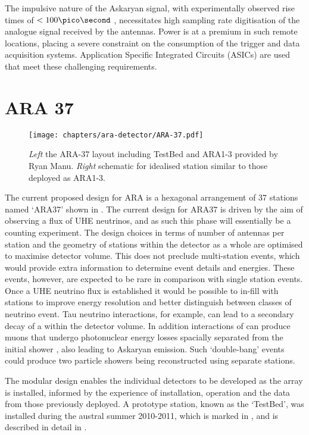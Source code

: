 The impulsive nature of the Askaryan signal, with experimentally observed rise times of $< 100 \pico \second$ \cite{PhysRevLett.86.2802}, necessitates high sampling rate digitisation of the analogue signal received by the antennas. Power is at a premium in such remote locations, placing a severe constraint on the consumption of the trigger and data acquisition systems. Application Specific Integrated Circuits (ASICs) are used that meet these challenging requirements.



\section{ARA 37}
\label{sec:ara-detector:ARA37}

\begin{figure}[htpb]
  \centering
  \texttt{[image: chapters/ara-detector/ARA-37.pdf]}
  \caption{\textit{Left} the ARA-37 layout including TestBed and ARA1-3 provided by Ryan Manu. \textit{Right} schematic for idealised station similar to those deployed as ARA1-3.}
  \label{fig:ara-detector:ARA-37:ARA-37}
\end{figure}

The current proposed design for ARA is a hexagonal arrangement of 37 stations named `ARA37' shown in . The current design for ARA37 is driven by the aim of observing a flux of UHE neutrinos, and as such this phase will essentially be a counting experiment. The design choices in terms of number of antennas per station and the geometry of stations within the detector as a whole are optimised to maximise detector volume. This does not preclude multi-station events, which would provide extra information to determine event details and energies. These events, however, are expected to be rare in comparison with single station events. Once a UHE neutrino flux is established it would be possible to in-fill with stations to improve energy resolution and better distinguish between classes of neutrino event. Tau neutrino interactions, for example, can lead to a secondary decay of a \Ptau within the detector volume. In addition interactions of \Pnum can produce muons that undergo photonuclear energy losses spacially separated from the initial shower \cite{MercurioThesis}, also leading to Askaryan emission. Such `double-bang' events could produce two particle showers being reconstructed using separate stations.


The modular design enables the individual detectors to be developed as the array is installed, informed by the experience of installation, operation and the data from those previously deployed. A prototype station, known as the `TestBed', was installed during the austral summer 2010-2011, which is marked in , and is described in detail in . 



